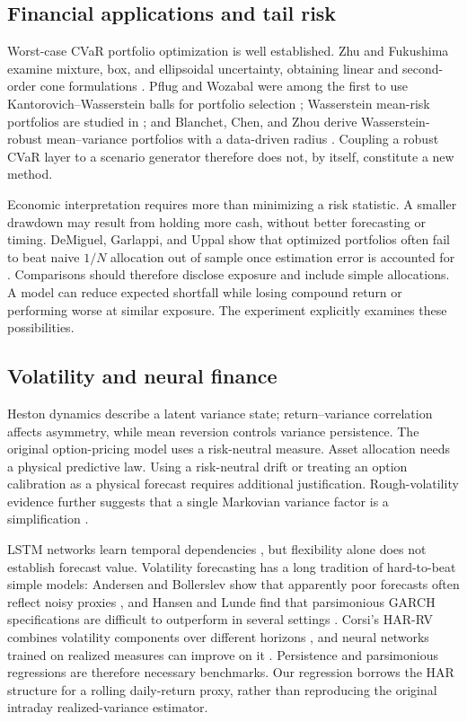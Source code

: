 \subsection{Financial applications and tail risk}
Worst-case CVaR portfolio optimization is well established. Zhu and Fukushima examine mixture, box, and ellipsoidal uncertainty, obtaining linear and second-order cone formulations \cite{zhu}. Pflug and Wozabal were among the first to use Kantorovich--Wasserstein balls for portfolio selection \cite{pflug}; Wasserstein mean-risk portfolios are studied in \cite{esfahani}; and Blanchet, Chen, and Zhou derive Wasserstein-robust mean--variance portfolios with a data-driven radius \cite{bcz}. Coupling a robust CVaR layer to a scenario generator therefore does not, by itself, constitute a new method.

Economic interpretation requires more than minimizing a risk statistic. A smaller drawdown may result from holding more cash, without better forecasting or timing. DeMiguel, Garlappi, and Uppal show that optimized portfolios often fail to beat naive $1/N$ allocation out of sample once estimation error is accounted for \cite{demiguel}. Comparisons should therefore disclose exposure and include simple allocations. A model can reduce expected shortfall while losing compound return or performing worse at similar exposure. The experiment explicitly examines these possibilities.

\subsection{Volatility and neural finance}
Heston dynamics describe a latent variance state; return--variance correlation affects asymmetry, while mean reversion controls variance persistence. The original option-pricing model uses a risk-neutral measure. Asset allocation needs a physical predictive law. Using a risk-neutral drift or treating an option calibration as a physical forecast requires additional justification. Rough-volatility evidence further suggests that a single Markovian variance factor is a simplification \cite{gatheral}.

LSTM networks learn temporal dependencies \cite{lstm}, but flexibility alone does not establish forecast value. Volatility forecasting has a long tradition of hard-to-beat simple models: Andersen and Bollerslev show that apparently poor forecasts often reflect noisy proxies \cite{andersenbollerslev}, and Hansen and Lunde find that parsimonious GARCH specifications are difficult to outperform in several settings \cite{hansenlunde}. Corsi's HAR-RV combines volatility components over different horizons \cite{corsi}, and neural networks trained on realized measures can improve on it \cite{bucci}. Persistence and parsimonious regressions are therefore necessary benchmarks. Our regression borrows the HAR structure for a rolling daily-return proxy, rather than reproducing the original intraday realized-variance estimator.


